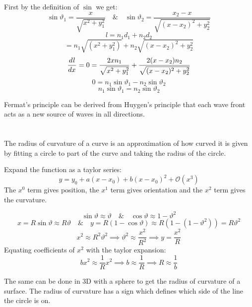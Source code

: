First by the definition of \(\sin\) we get:
\[\sin\vartheta_1=\frac{x}{\sqrt{x^2+y_1^2}}\quad\&\quad\sin\vartheta_2=\frac{x_2-x}{\sqrt{(x-x_2)^2+y_2^2}}\]
\[l=n_1d_1+n_2d_2\]
\[=n_1\sqrt{(x^2+y_1^2)}+n_2\sqrt{(x-x_2)^2+y_2^2}\]
\[\frac{d^{}{l}}{d{x}^{}}=0=\frac{2xn_1}{\sqrt{x^2+y_1^2}}+\frac{2(x-x_2)n_2}{\sqrt{(x-x_2)^2+y_2^2}}\]
\[0=n_1\sin\vartheta_1-n_2\sin\vartheta_2\]
\[n_1\sin\vartheta_1=n_2\sin\vartheta_2\]

Fermat's principle can be derived from Huygen's principle that each wave front acts as a new source of waves in all directions.

\section{}

The radius of curvature of a curve is an approximation of how curved it is given by fitting a circle to part of the curve and taking the radius of the circle.

Expand the function as a taylor series:
\[y=y_0+a(x-x_0)+b(x-x_0)^2+\mathcal{O}(x^3)\]
The \(x^0\) term gives position, the \(x^1\) term gives orientation and the \(x^2\) term gives the curvature.

\begin{center}
\end{center}

\[\sin\vartheta\approx\vartheta\quad\&\quad\cos\vartheta\approx1-\vartheta^2\]
\[x=R\sin\vartheta\approx R\vartheta\quad\&\quad y=R(1-\cos\vartheta)\approx R(1-(1-\vartheta^2))=R\vartheta^2\]
\[x^2\approx R^2\vartheta^2\implies\vartheta^2\approx\frac{x^2}{R^2}\implies y=\frac{x^2}{R}\]
Equating coefficients of \(x^2\) with the taylor expansion:
\[bx^2\approx\frac 1Rx^2\implies b\approx\frac 1R\implies R\approx\frac 1b\]

The same can be done in 3D with a sphere to get the radius of curvature of a surface. The radius of curvature has a sign which defines which side of the line the circle is on.

